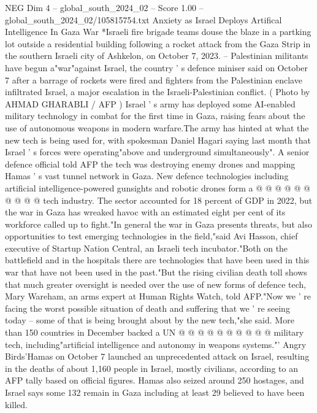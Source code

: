\begin{textsample}{NEG Dim 4 – global\_south\_2024\_02 – Score 1.00 – global\_south\_2024\_02/105815754.txt}  \label{ex:f4_neg_384}
Anxiety as Israel Deploys Artifical Intelligence In Gaza War *Israeli fire brigade teams douse the blaze in a partking lot outside a residential building following a rocket attack from the Gaza Strip in the southern Israeli city of Ashkelon, on October 7, 2023. -- Palestinian militants have begun a"war"against Israel, the country ' s defence miniser said on October 7 after a barrage of rockets were fired and fighters from the Palestinian enclave infiltrated Israel, a major escalation in the Israeli-Palestinian conflict. ( Photo by AHMAD GHARABLI / AFP ) Israel ' s army has deployed some AI-enabled military technology in combat for the first time in Gaza, raising fears about the use of autonomous weapons in modern warfare.The army has hinted at what the new tech is being used for, with spokesman Daniel Hagari saying last month that Israel ' s forces were operating"above and underground simultaneously".
A senior defence official told AFP the tech was destroying enemy drones and mapping Hamas ' s vast tunnel network in Gaza.
New defence technologies including artificial intelligence-powered gunsights and robotic drones form a @ @ @ @ @ @ @ @ @ @ tech industry.
The sector accounted for 18 percent of GDP in 2022, but the war in Gaza has wreaked havoc with an estimated eight per cent of its workforce called up to fight."In general the war in Gaza presents threats, but also opportunities to test emerging technologies in the field,"said Avi Hasson, chief executive of Startup Nation Central, an Israeli tech incubator."Both on the battlefield and in the hospitals there are technologies that have been used in this war that have not been used in the past."But the rising civilian death toll shows that much greater oversight is needed over the use of new forms of defence tech, Mary Wareham, an arms expert at Human Rights Watch, told AFP."Now we ' re facing the worst possible situation of death and suffering that we ' re seeing today -- some of that is being brought about by the new tech,"she said.
More than 150 countries in December backed a UN @ @ @ @ @ @ @ @ @ @ military tech, including"artificial intelligence and autonomy in weapons systems."' Angry Birds'Hamas on October 7 launched an unprecedented attack on Israel, resulting in the deaths of about 1,160 people in Israel, mostly civilians, according to an AFP tally based on official figures.
Hamas also seized around 250 hostages, and Israel says some 132 remain in Gaza including at least 29 believed to have been killed.

\end{textsample}
